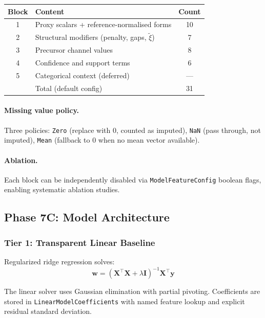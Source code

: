 \documentclass[11pt]{article}
\newcommand{\type}[1]{\texttt{#1}}
\begin{document}
\begin{center}
\begin{tabular}{clc}
\toprule
\textbf{Block} & \textbf{Content} & \textbf{Count} \\
\midrule
1 & Proxy scalars + reference-normalised forms & 10 \\
2 & Structural modifiers (penalty, gaps, $\tilde\xi$) & 7 \\
3 & Precursor channel values & 8 \\
4 & Confidence and support terms & 6 \\
5 & Categorical context (deferred) & --- \\
\midrule
  & Total (default config) & 31 \\
\bottomrule
\end{tabular}
\end{center}

\paragraph{Missing value policy.}
Three policies: \texttt{Zero} (replace with 0, counted as imputed),
\texttt{NaN} (pass through, not imputed), \texttt{Mean} (fallback to 0
when no mean vector available).

\paragraph{Ablation.}
Each block can be independently disabled via \type{ModelFeatureConfig}
boolean flags, enabling systematic ablation studies.

\subsection{Phase 7C: Model Architecture}

\subsubsection{Tier 1: Transparent Linear Baseline}

Regularized ridge regression solves:
\begin{equation}
  \mathbf{w} = (\mathbf{X}^\top \mathbf{X} + \lambda \mathbf{I})^{-1}
               \mathbf{X}^\top \mathbf{y}
  \label{eq:ridge}
\end{equation}

The linear solver uses Gaussian elimination with partial pivoting.
Coefficients are stored in \type{LinearModelCoefficients} with named
feature lookup and explicit residual standard deviation.
\end{document}
